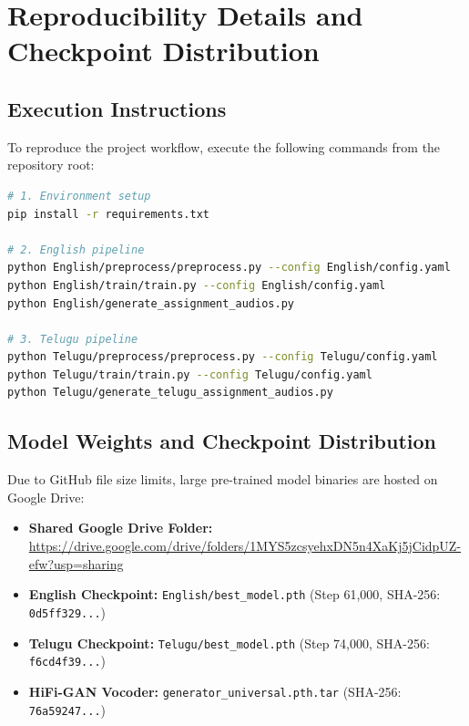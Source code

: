 \documentclass[11pt,a4paper]{article}
\begin{document}
\section{Reproducibility Details and Checkpoint Distribution}

\subsection{Execution Instructions}
To reproduce the project workflow, execute the following commands from the repository root:
\begin{lstlisting}[language=bash]
# 1. Environment setup
pip install -r requirements.txt

# 2. English pipeline
python English/preprocess/preprocess.py --config English/config.yaml
python English/train/train.py --config English/config.yaml
python English/generate_assignment_audios.py

# 3. Telugu pipeline
python Telugu/preprocess/preprocess.py --config Telugu/config.yaml
python Telugu/train/train.py --config Telugu/config.yaml
python Telugu/generate_telugu_assignment_audios.py
\end{lstlisting}

\subsection{Model Weights and Checkpoint Distribution}
Due to GitHub file size limits, large pre-trained model binaries are hosted on Google Drive:
\begin{itemize}
    \item \textbf{Shared Google Drive Folder:} \url{https://drive.google.com/drive/folders/1MYS5zcsyehxDN5n4XaKj5jCidpUZ-efw?usp=sharing}
    \item \textbf{English Checkpoint:} \texttt{English/best\_model.pth} (Step 61,000, SHA-256: \texttt{0d5ff329...})
    \item \textbf{Telugu Checkpoint:} \texttt{Telugu/best\_model.pth} (Step 74,000, SHA-256: \texttt{f6cd4f39...})
    \item \textbf{HiFi-GAN Vocoder:} \texttt{generator\_universal.pth.tar} (SHA-256: \texttt{76a59247...})
\end{itemize}

\end{document}
